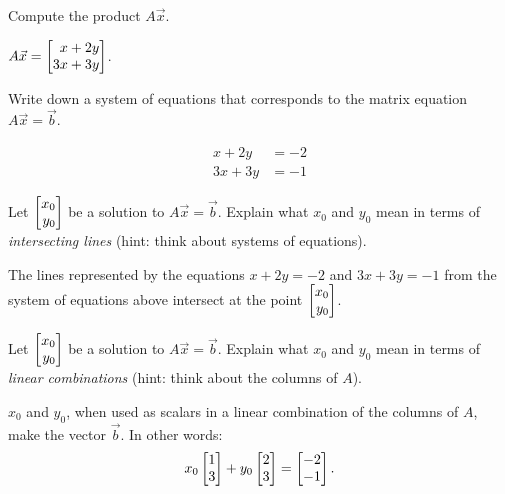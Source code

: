 	\begin{parts}
		\item Compute the product $A\vec x$.
			\begin{solution}
				$A \vec x = \mat{x+2y\\3x+3y}$.
			\end{solution}
		\item Write down a system of equations that corresponds to the matrix equation
			$A\vec x=\vec b$.
			\begin{solution}
				\begin{align*}
					x + 2y &= -2 \\
					3x + 3y &= -1
				\end{align*}
			\end{solution}
		\item Let $\mat{x_0\\y_0}$ be a solution to $A\vec x=\vec b$. Explain what
			$x_0$ and $y_0$ mean in terms of \emph{intersecting lines} (hint: think
			about systems of equations).
			\begin{solution}
				The lines represented by the equations $x+2y=-2$ and $3x+3y=-1$
				from the system of equations above intersect at the point $\mat{x_0\\y_0}$.
			\end{solution}
		\item Let $\mat{x_0\\y_0}$ be a solution to $A\vec x=\vec b$. Explain what
			$x_0$ and $y_0$ mean in terms of \emph{linear combinations} (hint: think
			about the columns of $A$).
			\begin{solution}
				$x_0$ and $y_0$, when used as scalars in a linear combination of
				the columns of $A$, make the vector $\vec b$. In other words:
				\[
					x_0 \mat{1\\3} + y_0 \mat{2\\3} = \mat{-2\\-1}.
				\]
			\end{solution}
	\end{parts}


